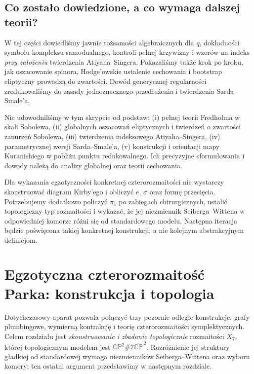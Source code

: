 \section{Co zostało dowiedzione, a co wymaga dalszej teorii?}
\label{sec:tg-sw12-scope}

W tej części dowiedliśmy jawnie tożsamości algebraicznych
dla $q$, dokładności symbolu kompleksu samodualnego,
kontroli pełnej krzywizny i wzorów na indeks
\emph{przy założeniu} twierdzenia Atiyaha--Singera.
Pokazaliśmy także krok po kroku, jak oszacowanie spinora,
Hodge'owskie ustalenie cechowania i bootstrap eliptyczny
prowadzą do zwartości. Dowód generycznej regularności
zredukowaliśmy do zasady jednoznacznego przedłużenia
i twierdzenia Sarda--Smale'a.

Nie udowodniliśmy w tym skrypcie od podstaw:
(i) pełnej teorii Fredholma w skali Sobolewa,
(ii) globalnych oszacowań eliptycznych i twierdzeń o
zwartości zanurzeń Sobolewa,
(iii) twierdzenia indeksowego Atiyaha--Singera,
(iv) parametrycznej wersji Sarda--Smale'a,
(v) konstrukcji i orientacji mapy Kuranishiego
w pobliżu punktu redukowalnego. Ich precyzyjne
sformułowania i dowody należą do analizy globalnej
oraz teorii cechowania.

\begin{uwaga}
Dla wykazania egzotyczności konkretnej czterorozmaitości
nie wystarczy skonstruować diagram Kirby'ego i obliczyć
$e$, $\sigma$ oraz formę przecięcia. Potrzebujemy dodatkowo
policzyć $\pi_1$ po zabiegach chirurgicznych,
ustalić topologiczny typ rozmaitości i wykazać, że
jej niezmiennik Seiberga--Wittena w odpowiedniej
komorze różni się od standardowego modelu.
Następna iteracja będzie poświęcona takiej konkretnej
konstrukcji, a nie kolejnym abstrakcyjnym definicjom.
\end{uwaga}


\chapter{Egzotyczna czterorozmaitość Parka: konstrukcja i topologia}
\label{ch:tg-park}

Dotychczasowy aparat pozwala połączyć trzy pozornie odległe
konstrukcje: grafy plumbingowe, wymierną kontrakcję i teorię
czterorozmaitości symplektycznych. Celem rozdziału jest
\emph{skonstruowanie i zbadanie topologicznie} rozmaitości
$X_7$, której topologicznym modelem jest
$\mathbb{CP}^{2}\#7\overline{\mathbb{CP}}^{\,2}$.
Rozróżnienie jej struktury gładkiej od standardowej wymaga
niezmienników Seiberga--Wittena oraz wyboru komory; ten
ostatni argument przedstawimy w następnym rozdziale.

